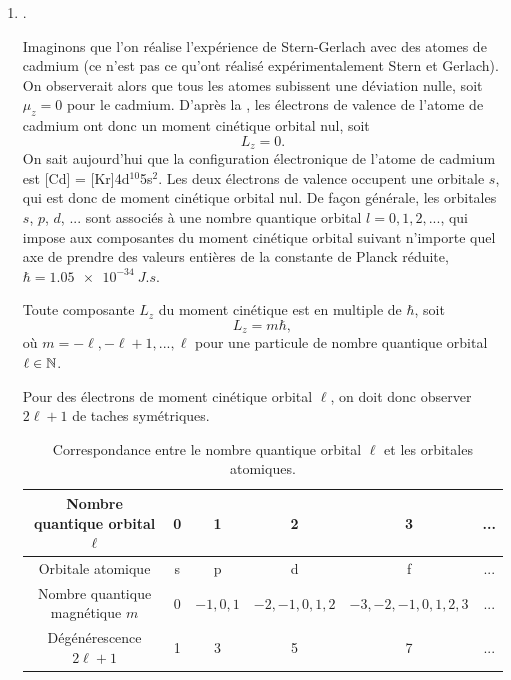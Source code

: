 \documentclass[12pt,fancy]{cours}
\begin{document}

\begin{enumerate}
    \item {}. 
    
    
    Imaginons que l'on réalise l'expérience de Stern-Gerlach avec des atomes de cadmium (ce n'est pas ce qu'ont réalisé expérimentalement Stern et Gerlach). On observerait alors que tous les atomes subissent une déviation nulle, soit $\mu_z=0$ pour le cadmium. D'après la , les électrons de valence de l'atome de cadmium ont donc un moment cinétique orbital nul, soit 
    \begin{equation}
      L_z = 0.
    \end{equation}
    On sait aujourd'hui que la configuration électronique de l'atome de cadmium est [Cd] = [Kr]4d$^{10}$5s$^2$. Les deux électrons de valence occupent une orbitale $s$, qui est donc de moment cinétique orbital nul. De façon générale, les orbitales $s$, $p$, $d$, ... sont associés à une nombre quantique orbital $l=0,1,2,...$, qui impose aux composantes du moment cinétique orbital suivant n'importe quel axe de prendre des valeurs entières de la constante de Planck réduite, $\hbar = \SI{1.05e-34}{J.s}$.

      \begin{prop}\label{prop:quant}
        Toute composante $L_z$  du moment cinétique  est  en multiple de $\hbar$, soit 
        \begin{equation*}
      L_z = m \hbar,
    \end{equation*}
    où $m=-\ell,-\ell+1,...,\ell$ pour une particule de nombre quantique orbital $\ell \in \mathbb{N}$.
  \end{prop}
  Pour des électrons de moment cinétique orbital $\ell$, on doit donc observer $2\ell+1$ de taches symétriques. 

  \begin{table}[h!]
    \centering
    \begin{tabular}{|c| c c c c c|}
      \hline
      Nombre quantique orbital $\ell$ & 0 & 1 & 2 & 3 & ... \\
      \hline
      Orbitale atomique & s & p & d & f & ... \\
      \hline
      Nombre quantique magnétique $m$ & $0$ & $-1,0,1$ & $-2,-1,0,1,2$ & $-3,-2,-1,0,1,2,3$ & ... \\
      \hline 
      Dégénérescence $2\ell+1$ & 1 & 3 & 5 & 7 & ...\\ 
      \hline
    \end{tabular}
    \caption{Correspondance entre le nombre quantique orbital $\ell$ et les orbitales atomiques.}
    \label{}
    

\end{table}
\end{enumerate}
\end{document}
